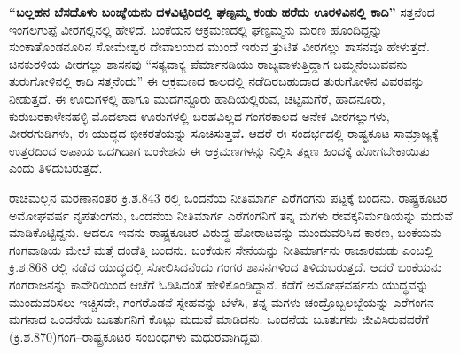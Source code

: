 \textbf{ “ಬಲ್ಲಹನ ಬೆಸದೊಳು ಬಂಙ್ಕೆಯನು ದಳವಿಟ್ಟಿರಿದಲ್ಲಿ ಘಣ್ಟಮ್ಮ ಕಂಡು ಹರೆದು ಊರಳಿವಿನಲ್ಲಿ ಕಾದಿ”} ಸತ್ತನೆಂದ ಇಂಗಲಗುಪ್ಪೆ ವೀರಗಲ್ಲಿನಲ್ಲಿ ಹೇಳಿದೆ. ಬಂಕೆಯನ ಆಕ್ರಮಣದಲ್ಲಿ ಘಣ್ಟಮ್ಮನು ಮರಣ ಹೊಂದಿದ್ದನ್ನು ಸುಂಕಾತೊಂಡನೂರಿನ ಸೋಮೇಶ್ವರ ದೇವಾಲಯದ ಮುಂದೆ ಇರುವ ತ್ರುಟಿತ ವೀರಗಲ್ಲು ಶಾಸನವೂ ಹೇಳುತ್ತದೆ. ಚಿನಕುರಳಿಯ ವೀರಗಲ್ಲು ಶಾಸನವು “ಸತ್ಯವಾಕ್ಯ ಪೆರ್ಮಾನಡಿಯು ರಾಜ್ಯವಾಳುತ್ತಿದ್ದಾಗ ಬಮ್ಮನೆಂಬುವವನು ತುರುಗೋಳಿನಲ್ಲಿ ಕಾದಿ ಸತ್ತನೆಂದು” ಈ ಆಕ್ರಮಣದ ಕಾಲದಲ್ಲಿ ನಡೆದಿರಬಹುದಾದ ತುರುಗೋಳಿನ ವಿವರವನ್ನು ನೀಡುತ್ತದೆ. ಈ ಊರುಗಳಲ್ಲಿ ಹಾಗೂ ಮುದಗನ್ದೂರು ಹಾದಿಯಲ್ಲಿರುವ, ಚಟ್ಟಮಗೆರೆ, ಹಾದನೂರು, ಕುರುಬರಕಾಳೇನಹಳ್ಳಿ ಮೊದಲಾದ ಊರುಗಳಲ್ಲಿ ಬರಹವಿಲ್ಲದ ಗಂಗರಕಾಲದ ಅನೇಕ ವೀರಗಲ್ಲುಗಳು, ವೀರರಗುಡಿಗಳು, ಈ ಯುದ್ಧದ ಭೀಕರತೆಯನ್ನು ಸೂಚಿಸುತ್ತವೆ\textbf{.} ಆದರೆ ಈ ಸಂದರ್ಭದಲ್ಲಿ ರಾಷ್ಟ್ರಕೂಟ ಸಾಮ್ರಾಜ್ಯಕ್ಕೆ ಉತ್ತರದಿಂದ ಅಪಾಯ ಒದಗಿದಾಗ ಬಂಕೇಶನು ಈ ಆಕ್ರಮಣಗಳನ್ನು ನಿಲ್ಲಿಸಿ ತಕ್ಷಣ ಹಿಂದಕ್ಕೆ ಹೋಗಬೇಕಾಯಿತು ಎಂದು ತಿಳಿದುಬರುತ್ತದೆ. 

ರಾಚಮಲ್ಲನ ಮರಣಾನಂತರ ಕ್ರಿ.ಶ.843 ರಲ್ಲಿ ಒಂದನೆಯ ನೀತಿಮಾರ್ಗ ಎರೆಗಂಗನು ಪಟ್ಟಕ್ಕೆ ಬಂದನು. ರಾಷ್ಟ್ರಕೂಟರ ಅಮೋಘವರ್ಷ ನೃಪತುಂಗನು, ಒಂದನೆಯ ನೀತಿಮಾರ್ಗ ಎರೆಗಂಗನಿಗೆ ತನ್ನ ಮಗಳು ರೇವಕ್ಕನಿರ್ಮಡಿಯನ್ನು ಮದುವೆ ಮಾಡಿಕೊಟ್ಟಿದ್ದನು. ಆದರೂ ಇವನು ರಾಷ್ಟ್ರಕೂಟರ ವಿರುದ್ಧ ಹೋರಾಟವನ್ನು ಮುಂದುವರಿಸಿದ ಕಾರಣ, ಬಂಕೆಯನು ಗಂಗವಾಡಿಯ ಮೇಲೆ ಮತ್ತೆ ದಂಡೆತ್ತಿ ಬಂದನು. ಬಂಕೆಯನ ಸೇನೆಯನ್ನು ನೀತಿಮಾರ್ಗನು ರಾಜಾರಮಡು ಎಂಬಲ್ಲಿ ಕ್ರಿ.ಶ.868 ರಲ್ಲಿ ನಡೆದ ಯುದ್ಧದಲ್ಲಿ ಸೋಲಿಸಿದನೆಂದು ಗಂಗರ ಶಾಸನಗಳಿಂದ ತಿಳಿದುಬರುತ್ತದೆ. ಆದರೆ ಬಂಕೆಯನು ಗಂಗರಾಜನನ್ನು ಕಾವೇರಿಯಿಂದ ಆಚೆಗೆ ಓಡಿಸಿದಂತೆ ಹೇಳಿಕೊಂಡಿದ್ದಾನೆ. ಕಡೆಗೆ ಅಮೋಘವರ್ಷನು ಯುದ್ಧವನ್ನು ಮುಂದುವರಿಸಲು ಇಚ್ಚಿಸದೇ, ಗಂಗರೊಡನೆ ಸ್ನೇಹವನ್ನು ಬೆಳೆಸಿ, ತನ್ನ ಮಗಳು ಚಂದ್ರೊಬ್ಬಲಬ್ಬೆಯನ್ನು ಎರೆಗಂಗನ ಮಗನಾದ ಒಂದನೆಯ ಬೂತುಗನಿಗೆ ಕೊಟ್ಟು ಮದುವೆ ಮಾಡಿದನು. ಒಂದನೆಯ ಬೂತುಗನು ಜೀವಿಸಿರುವವರೆಗೆ (ಕ್ರಿ.ಶ.870)\break ಗಂಗ–ರಾಷ್ಟ್ರಕೂಟರ ಸಂಬಂಧಗಳು ಮಧುರವಾಗಿದ್ದವು.


